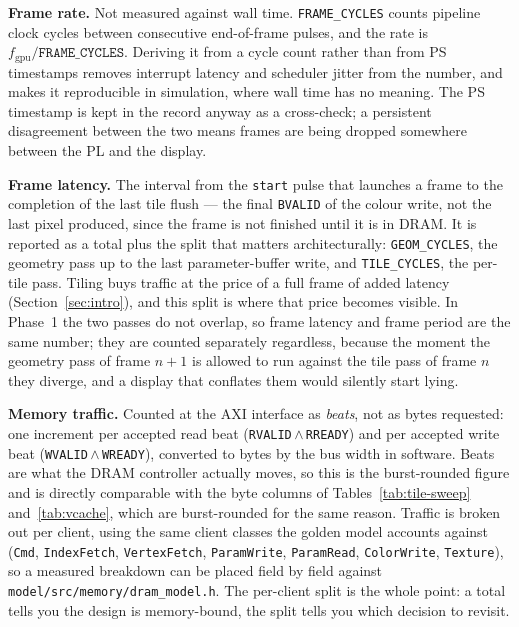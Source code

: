 \documentclass[11pt,a4paper]{article}
\newcommand{\field}[1]{\textbf{#1}\quad}
\begin{document}
\field{Frame rate.} Not measured against wall time. \texttt{FRAME\_CYCLES}
counts pipeline clock cycles between consecutive end-of-frame pulses, and the
rate is $f_{\mathrm{gpu}} / \texttt{FRAME\_CYCLES}$. Deriving it from a cycle
count rather than from PS timestamps removes interrupt latency and scheduler
jitter from the number, and makes it reproducible in simulation, where wall time
has no meaning. The PS timestamp is kept in the record anyway as a cross-check;
a persistent disagreement between the two means frames are being dropped
somewhere between the PL and the display.

\field{Frame latency.} The interval from the \texttt{start} pulse that launches
a frame to the completion of the last tile flush --- the final \texttt{BVALID}
of the colour write, not the last pixel produced, since the frame is not
finished until it is in DRAM. It is reported as a total plus the split that
matters architecturally: \texttt{GEOM\_CYCLES}, the geometry pass up to the last
parameter-buffer write, and \texttt{TILE\_CYCLES}, the per-tile pass. Tiling
buys traffic at the price of a full frame of added latency
(Section~\ref{sec:intro}), and this split is where that price becomes visible.
In Phase~1 the two passes do not overlap, so frame latency and frame period are
the same number; they are counted separately regardless, because the moment the
geometry pass of frame $n{+}1$ is allowed to run against the tile pass of frame
$n$ they diverge, and a display that conflates them would silently start lying.

\field{Memory traffic.} Counted at the AXI interface as \emph{beats}, not as
bytes requested: one increment per accepted read beat
(\texttt{RVALID}\,$\land$\,\texttt{RREADY}) and per accepted write beat
(\texttt{WVALID}\,$\land$\,\texttt{WREADY}), converted to bytes by the bus width
in software. Beats are what the DRAM controller actually moves, so this is the
burst-rounded figure and is directly comparable with the byte columns of
Tables~\ref{tab:tile-sweep} and~\ref{tab:vcache}, which are burst-rounded for
the same reason. Traffic is broken out per client, using the same client
classes the golden model accounts against (\texttt{Cmd},
\texttt{IndexFetch}, \texttt{VertexFetch}, \texttt{ParamWrite},
\texttt{ParamRead}, \texttt{ColorWrite}, \texttt{Texture}), so a measured
breakdown can be placed field by field against
\texttt{model/src/memory/dram\_model.h}. The per-client split is the whole
point: a total tells you the design is memory-bound, the split tells you which
decision to revisit.
\end{document}
